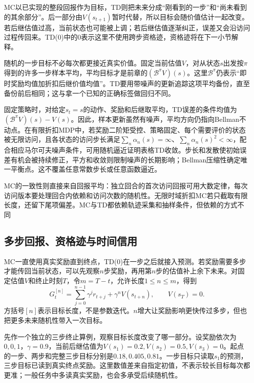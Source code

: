 MC以已实现的整段回报作为目标，TD则把未来分成“刚看到的一步”和“尚未看到的其余部分”。后一部分由$V(s_{t+1})$暂时代替，所以目标会随价值估计一起改变。若后继估值过高，当前状态也可能被上调；若后继估值逐渐纠正，误差又会沿访问过程传回来。TD(0)中的0表示这里不使用跨步资格迹，资格迹将在下一小节解释。

随机的一步目标不必每次都更接近真实价值。固定当前估值$V$，对从状态$s$出发按$\pi$得到的许多一步样本平均，平均目标才是前章的$(\mathcal B^\pi V)(s)$。这里$\mathcal B^\pi$仍表示“即时奖励均值加折扣后继价值均值”。TD要用带噪声的更新追踪这项平均备份，直至备份前后相同；这与拿一个已知的正确标签做回归不同。

固定策略时，对给定$s_t=s$的动作、奖励和后继取平均，TD误差的条件均值为$(\mathcal B^\pi V)(s)-V(s)$。因此，样本更新虽然有噪声，平均方向仍指向Bellman不动点。在有限折扣MDP中，若奖励二阶矩受控、策略固定、每个需要评价的状态被无限访问，且各状态的访问步长满足$\sum_n\alpha_n(s)=\infty$、$\sum_n\alpha_n(s)^2<\infty$，配合相应马尔可夫噪声条件，可用随机逼近证明表格TD收敛。步长和发散使初始误差有机会被持续修正，平方和收敛则限制噪声的长期影响；Bellman压缩性确定唯一平衡点。这不覆盖任意常数步长或任意函数逼近。

MC的一致性则直接来自回报平均：独立回合的首次访问回报可用大数定律，每次访问版本要处理回合内依赖和访问次数的随机性。无限时域折扣MC若只截取有限长度，还留下尾项偏差。MC与TD都依赖轨迹采集和抽样条件，但依赖的方式不同

\subsection{多步回报、资格迹与时间信用}
\label{sec:rl-learning-traces}

MC一直使用真实奖励直到终点，TD(0)在一步之后就接入预测。若奖励需要多步才能传回当前状态，可以先观察$n$步奖励，再用第$n$步的估值补上余下未来。对固定估值$V$和终止时刻$T$，令$m=T-t$，允许长度$1\leq n\leq m$，得到
\begin{equation}
  G_t^{[n]}=\sum_{j=0}^{n-1}\gamma^j r_{t+j}
                    +\gamma^n V(s_{t+n}),\qquad V(s_T)=0.
  \label{eq:rl-learning-n-step}
\end{equation}
方括号$[n]$表示目标长度，不是参数迭代。$n$增大让奖励影响更快传过多步，但也把更多未来随机性带入一次目标。

先作一个独立的三步终止算例，观察目标长度改变了哪一部分。设奖励依次为$0,0,1$，$\gamma=0.9$，当前后继估值为$V(s_1)=0.2,V(s_2)=0.5,V(s_3)=0$。起点的一步、两步和完整三步目标分别是$0.18,0.405,0.81$。一步目标只读取$s_1$的预测，三步目标已读到真实终点奖励。这里数值差来自指定初值，不表示较长目标每次都更准；一般任务中多读真实奖励，也会多承受后续随机性。

